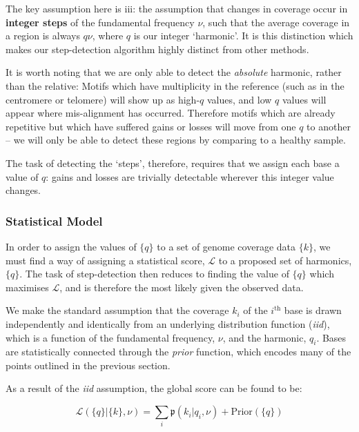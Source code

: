 \documentclass[fleqn,usenatbib]{mnras}
\begin{document}
				The key assumption here is iii: the assumption that changes in coverage occur in \textbf{integer steps} of the fundamental frequency $\nu$, such that the average coverage in a region is always $q \nu$, where $q$ is our integer `harmonic'. It is this distinction which makes our step-detection algorithm highly distinct from other methods. 

				It is worth noting that we are only able to detect the \textit{absolute} harmonic, rather than the relative: Motifs which have multiplicity in the reference (such as in the centromere or telomere) will show up as high-$q$ values, and low $q$ values will appear where mis-alignment has occurred. Therefore motifs which are already repetitive but which have suffered gains or losses will move from one $q$ to another -- we will only be able to detect these regions by comparing to a healthy sample. 
				
				The task of detecting the `steps', therefore, requires that we assign each base a value of $q$: gains and losses are trivially detectable wherever this integer value changes.

			\subsubsection{Statistical Model}

				In order to assign the values of $\{q\}$ to a set of genome coverage data $\{k\}$, we must find a way of assigning a statistical score, $\mathcal{L}$ to a proposed set of harmonics, $\{q\}$. The task of step-detection then reduces to finding the value of $\{q\}$ which maximises $\mathcal{L}$, and is therefore the most likely given the observed data.

				We make the standard assumption that the coverage $k_i$ of the $i^\text{th}$ base is drawn independently and identically from an underlying distribution function (\textit{iid}), which is a function of the fundamental frequency, $\nu$, and the harmonic, $q_i$. Bases are statistically connected through the \textit{prior} function, which encodes many of the points outlined in the previous section. 
				
				As a result of the \textit{iid} assumption, the global score can be found to be:

				\begin{equation}
					\mathcal{L}(\{q\} | \{k\}, \nu) = \sum_i \mathfrak{p}\left(k_i | q_i, \nu \right) + \text{Prior}(\{q\}) \label{E:Score}
				\end{equation}
\end{document}

